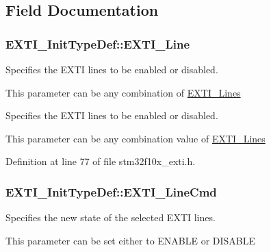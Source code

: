 \subsection{Field Documentation}
\hypertarget{struct_e_x_t_i___init_type_def_a1b5bb38e1df331f764b830a1e8ec171f}{
\subsubsection[{E\-X\-T\-I\-\_\-\-Line}]{ E\-X\-T\-I\-\_\-\-Init\-Type\-Def\-::\-E\-X\-T\-I\-\_\-\-Line}}\label{struct_e_x_t_i___init_type_def_a1b5bb38e1df331f764b830a1e8ec171f}
\begin{DoxyVerb}               Specifies the EXTI lines to be enabled or disabled.
\end{DoxyVerb}
 This parameter can be any combination of \hyperlink{group___e_x_t_i___lines}{E\-X\-T\-I\-\_\-\-Lines}

\begin{DoxyVerb}               Specifies the EXTI lines to be enabled or disabled.
\end{DoxyVerb}
 This parameter can be any combination value of \hyperlink{group___e_x_t_i___lines}{E\-X\-T\-I\-\_\-\-Lines} 

Definition at line 77 of file stm32f10x\-\_\-exti.\-h.

\hypertarget{struct_e_x_t_i___init_type_def_ac1769bc5badaef4cffbcf105e3fe1c27}{
\subsubsection[{E\-X\-T\-I\-\_\-\-Line\-Cmd}]{ E\-X\-T\-I\-\_\-\-Init\-Type\-Def\-::\-E\-X\-T\-I\-\_\-\-Line\-Cmd}}\label{struct_e_x_t_i___init_type_def_ac1769bc5badaef4cffbcf105e3fe1c27}
\begin{DoxyVerb}     Specifies the new state of the selected EXTI lines.
\end{DoxyVerb}
 This parameter can be set either to E\-N\-A\-B\-L\-E or D\-I\-S\-A\-B\-L\-E 

